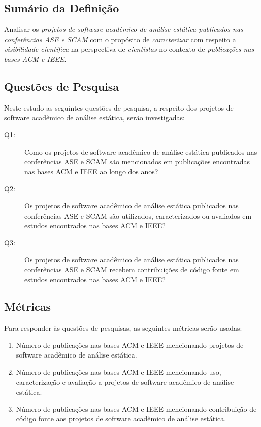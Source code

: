 \subsection{Sumário da Definição}

Analisar os \textit{projetos de software acadêmico de análise estática publicados nas conferências ASE e SCAM}
com o propósito de \textit{caracterizar}
com respeito a \textit{visibilidade científica}
na perspectiva de \textit{cientistas}
no contexto de \textit{publicações nas bases ACM e IEEE}.

\subsection{Questões de Pesquisa}

Neste estudo as seguintes questões de pesquisa, a respeito dos projetos de
software acadêmico de análise estática, serão investigadas:

\newcommand{\EstudoDoisQuestaoUm}{Como os projetos de software acadêmico de
análise estática publicados nas conferências ASE e SCAM são mencionados em
publicações encontradas nas bases ACM e IEEE ao longo dos anos?}

\newcommand{\EstudoDoisQuestaoDois}{Os projetos de software acadêmico de
análise estática publicados nas conferências ASE e SCAM são utilizados,
caracterizados ou avaliados em estudos encontrados nas bases ACM e IEEE?}

\newcommand{\EstudoDoisQuestaoTres}{Os projetos de software acadêmico de
análise estática publicados nas conferências ASE e SCAM recebem contribuições
de código fonte em estudos encontrados nas bases ACM e IEEE?}

\begin{description}
  \item [Q1:] \EstudoDoisQuestaoUm
  \item [Q2:] \EstudoDoisQuestaoDois
  \item [Q3:] \EstudoDoisQuestaoTres
\end{description}

\subsection{Métricas}

Para responder às questões de pesquisas, as seguintes métricas serão usadas:

\begin{enumerate}
  \item Número de publicações nas bases ACM e IEEE mencionando projetos de
    software acadêmico de análise estática.
  \item Número de publicações nas bases ACM e IEEE mencionando uso,
    caracterização e avaliação a projetos de software acadêmico de análise
    estática.
  \item Número de publicações nas bases ACM e IEEE mencionando contribuição de
    código fonte aos projetos de software acadêmico de análise estática.
\end{enumerate}


